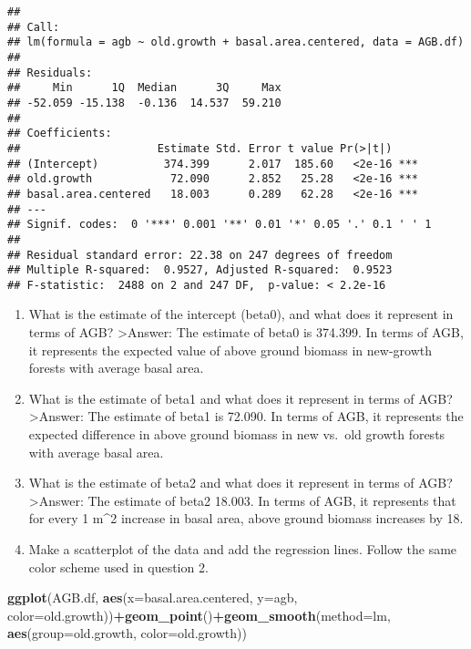 \documentclass[
]{article}
\newenvironment{Shaded}{\begin{snugshade}}{\end{snugshade}}
\newcommand{\AttributeTok}[1]{\textcolor[rgb]{0.13,0.29,0.53}{#1}}
\newcommand{\FunctionTok}[1]{\textcolor[rgb]{0.13,0.29,0.53}{\textbf{#1}}}
\newcommand{\NormalTok}[1]{#1}
\newcommand{\SpecialCharTok}[1]{\textcolor[rgb]{0.81,0.36,0.00}{\textbf{#1}}}
\begin{document}
\begin{verbatim}
## 
## Call:
## lm(formula = agb ~ old.growth + basal.area.centered, data = AGB.df)
## 
## Residuals:
##     Min      1Q  Median      3Q     Max 
## -52.059 -15.138  -0.136  14.537  59.210 
## 
## Coefficients:
##                     Estimate Std. Error t value Pr(>|t|)    
## (Intercept)          374.399      2.017  185.60   <2e-16 ***
## old.growth            72.090      2.852   25.28   <2e-16 ***
## basal.area.centered   18.003      0.289   62.28   <2e-16 ***
## ---
## Signif. codes:  0 '***' 0.001 '**' 0.01 '*' 0.05 '.' 0.1 ' ' 1
## 
## Residual standard error: 22.38 on 247 degrees of freedom
## Multiple R-squared:  0.9527, Adjusted R-squared:  0.9523 
## F-statistic:  2488 on 2 and 247 DF,  p-value: < 2.2e-16
\end{verbatim}

\begin{enumerate}
\def\labelenumi{\alph{enumi}.}
\item
  What is the estimate of the intercept (beta0), and what does it
  represent in terms of AGB? \textgreater Answer: The estimate of beta0
  is 374.399. In terms of AGB, it represents the expected value of above
  ground biomass in new-growth forests with average basal area.
\item
  What is the estimate of beta1 and what does it represent in terms of
  AGB? \textgreater Answer: The estimate of beta1 is 72.090. In terms of
  AGB, it represents the expected difference in above ground biomass in
  new vs.~old growth forests with average basal area.
\item
  What is the estimate of beta2 and what does it represent in terms of
  AGB? \textgreater Answer: The estimate of beta2 18.003. In terms of
  AGB, it represents that for every 1 m\^{}2 increase in basal area,
  above ground biomass increases by 18.
\item
  Make a scatterplot of the data and add the regression lines. Follow
  the same color scheme used in question 2.
\end{enumerate}

\begin{Shaded}
\begin{Highlighting}[]
\FunctionTok{ggplot}\NormalTok{(AGB.df, }\FunctionTok{aes}\NormalTok{(}\AttributeTok{x=}\NormalTok{basal.area.centered, }\AttributeTok{y=}\NormalTok{agb, }\AttributeTok{color=}\NormalTok{old.growth))}\SpecialCharTok{+}\FunctionTok{geom\_point}\NormalTok{()}\SpecialCharTok{+}\FunctionTok{geom\_smooth}\NormalTok{(}\AttributeTok{method=}\NormalTok{lm, }\FunctionTok{aes}\NormalTok{(}\AttributeTok{group=}\NormalTok{old.growth, }\AttributeTok{color=}\NormalTok{old.growth))}
\end{Highlighting}
\end{Shaded}
\end{document}
